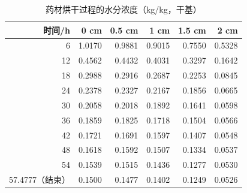 \begin{table}[htbp]
\centering
\caption{药材烘干过程的水分浓度（kg/kg，干基）}
\label{tab:q3-moisture}
\begin{tabular}{rrrrrr}
\toprule
时间/h & 0 cm & 0.5 cm & 1 cm & 1.5 cm & 2 cm \\
\midrule
6 & 1.0170 & 0.9881 & 0.9015 & 0.7550 & 0.5328 \\
12 & 0.4562 & 0.4432 & 0.4031 & 0.3297 & 0.1642 \\
18 & 0.2988 & 0.2916 & 0.2687 & 0.2253 & 0.0845 \\
24 & 0.2378 & 0.2327 & 0.2167 & 0.1856 & 0.0665 \\
30 & 0.2058 & 0.2018 & 0.1892 & 0.1641 & 0.0598 \\
36 & 0.1859 & 0.1825 & 0.1718 & 0.1504 & 0.0566 \\
42 & 0.1721 & 0.1691 & 0.1597 & 0.1407 & 0.0548 \\
48 & 0.1618 & 0.1592 & 0.1507 & 0.1334 & 0.0537 \\
54 & 0.1539 & 0.1515 & 0.1436 & 0.1277 & 0.0530 \\
57.4777（结束） & 0.1500 & 0.1477 & 0.1402 & 0.1249 & 0.0526 \\
\bottomrule
\end{tabular}
\end{table}
